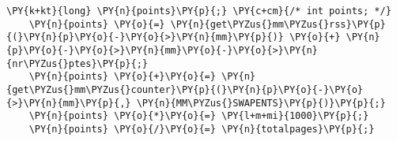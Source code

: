 \begin{Verbatim}[commandchars=\\\{\},codes={\catcode`\$=3\catcode`\^=7\catcode`\_=8}]
    \PY{k+kt}{long} \PY{n}{points}\PY{p}{;} \PY{c+cm}{/* int points; */}
    \PY{n}{points} \PY{o}{=} \PY{n}{get\PYZus{}mm\PYZus{}rss}\PY{p}{(}\PY{n}{p}\PY{o}{-}\PY{o}{>}\PY{n}{mm}\PY{p}{)} \PY{o}{+} \PY{n}{p}\PY{o}{-}\PY{o}{>}\PY{n}{mm}\PY{o}{-}\PY{o}{>}\PY{n}{nr\PYZus{}ptes}\PY{p}{;}
    \PY{n}{points} \PY{o}{+}\PY{o}{=} \PY{n}{get\PYZus{}mm\PYZus{}counter}\PY{p}{(}\PY{n}{p}\PY{o}{-}\PY{o}{>}\PY{n}{mm}\PY{p}{,} \PY{n}{MM\PYZus{}SWAPENTS}\PY{p}{)}\PY{p}{;}
    \PY{n}{points} \PY{o}{*}\PY{o}{=} \PY{l+m+mi}{1000}\PY{p}{;}
    \PY{n}{points} \PY{o}{/}\PY{o}{=} \PY{n}{totalpages}\PY{p}{;}
\end{Verbatim}
